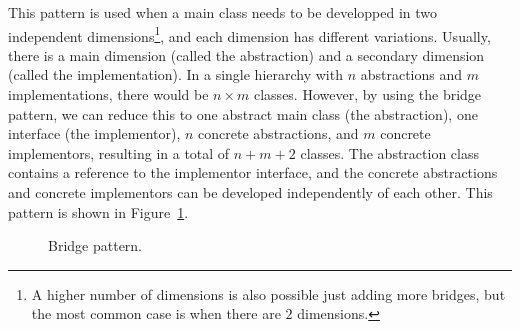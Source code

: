This pattern is used when a main class needs to be developped in two independent dimensions\footnote{A higher number of dimensions is also possible just adding more bridges, but the most common case is when there are $2$ dimensions.}, and each dimension has different variations. Usually, there is a main dimension (called the abstraction) and a secondary dimension (called the implementation). In a single hierarchy with $n$ abstractions and $m$ implementations, there would be $n \times m$ classes. However, by using the bridge pattern, we can reduce this to one abstract main class (the abstraction), one interface (the implementor), $n$ concrete abstractions, and $m$ concrete implementors, resulting in a total of $n + m + 2$ classes. The abstraction class contains a reference to the implementor interface, and the concrete abstractions and concrete implementors can be developed independently of each other. This pattern is shown in Figure~\ref{fig:bridge}.
\begin{figure}
    \centering
    \caption{Bridge pattern.}
    \label{fig:bridge}
\end{figure}

